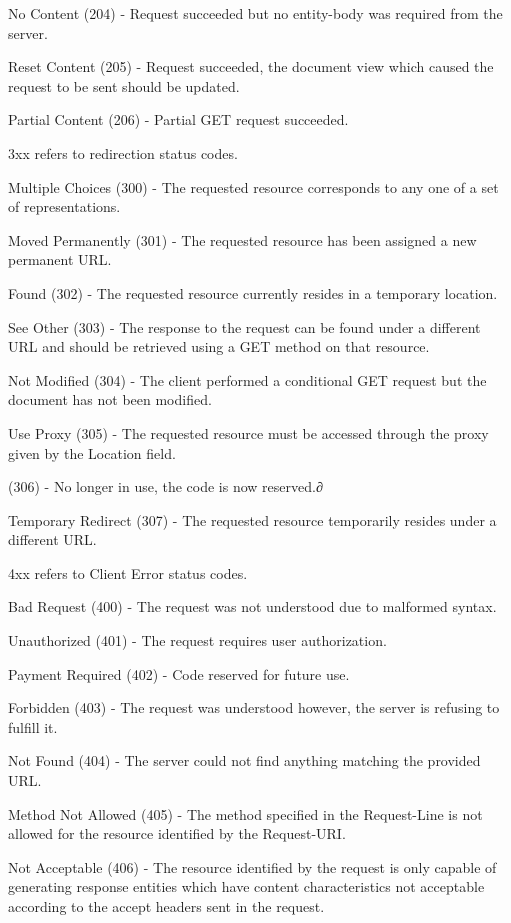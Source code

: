 \documentclass[12pt]{article}
\begin{document}
No Content (204) - Request succeeded but no entity-body was required from the server.

Reset Content (205) - Request succeeded, the document view which caused the request to be sent should be updated.

Partial Content (206) - Partial GET request succeeded.

3xx refers to redirection status codes.

Multiple Choices (300) - The requested resource corresponds to any one of a set of representations.

Moved Permanently (301) - The requested resource has been assigned a new permanent URL.

Found (302) - The requested resource currently resides in a temporary location.

See Other (303) - The response to the request can be found under a different URL and should be retrieved using a GET method on that resource.

Not Modified (304) - The client performed a conditional GET request but the document has not been modified.

Use Proxy (305) - The requested resource must be accessed through the proxy given by the Location field.

(306) - No longer in use, the code is now reserved.∂

Temporary Redirect (307) - The requested resource temporarily resides under a different URL.

4xx refers to Client Error status codes.

Bad Request (400) - The request was not understood due to malformed syntax.

Unauthorized (401) - The request requires user authorization.

Payment Required (402) - Code reserved for future use.

Forbidden (403) - The request was understood however, the server is refusing to fulfill it.

Not Found (404) - The server could not find anything matching the provided URL.

Method Not Allowed (405) - The method specified in the Request-Line is not allowed for the resource identified by the Request-URI.

Not Acceptable (406) - The resource identified by the request is only capable of generating response entities which have content characteristics not acceptable according to the accept headers sent in the request.
\end{document}
